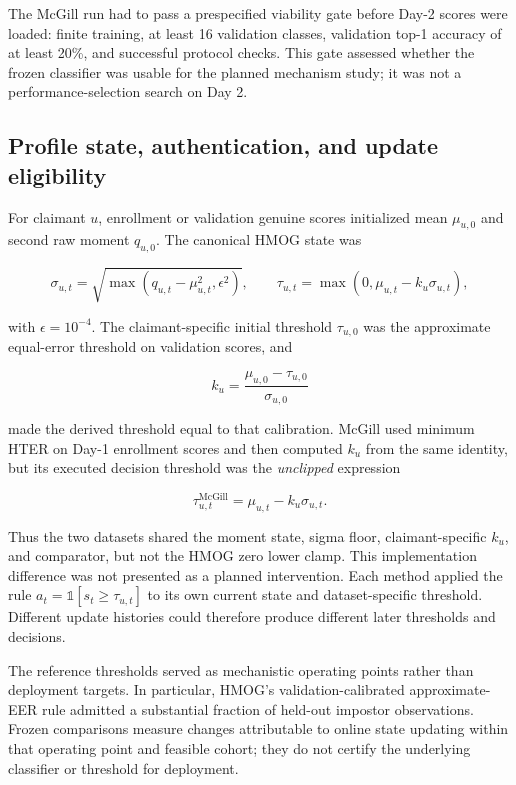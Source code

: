 \documentclass[technologies,article,submit,moreauthors]{Definitions/mdpi}
\begin{document}
The McGill run had to pass a prespecified viability gate before Day-2 scores were loaded: finite training, at least 16 validation classes, validation top-1 accuracy of at least 20\%, and successful protocol checks. This gate assessed whether the frozen classifier was usable for the planned mechanism study; it was not a performance-selection search on Day 2.

\subsection{Profile state, authentication, and update eligibility}\label{sec:profile-state-authentication-and-update-eligibility}

For claimant \(u\), enrollment or validation genuine scores initialized mean \(\mu_{u,0}\) and second raw moment \(q_{u,0}\). The canonical HMOG state was

\[
\sigma_{u,t}=\sqrt{\max(q_{u,t}-\mu_{u,t}^2,\epsilon^2)},
\qquad
\tau_{u,t}=\max(0,\mu_{u,t}-k_u\sigma_{u,t}),
\]

with \(\epsilon=10^{-4}\). The claimant-specific initial threshold \(\tau_{u,0}\) was the approximate equal-error threshold on validation scores, and

\[
k_u=\frac{\mu_{u,0}-\tau_{u,0}}{\sigma_{u,0}}
\]

made the derived threshold equal to that calibration. McGill used minimum HTER on Day-1 enrollment scores and then computed \(k_u\) from the same identity, but its executed decision threshold was the \emph{unclipped} expression

\[
\tau^{\mathrm{McGill}}_{u,t}=\mu_{u,t}-k_u\sigma_{u,t}.
\]

Thus the two datasets shared the moment state, sigma floor, claimant-specific \(k_u\), and comparator, but not the HMOG zero lower clamp. This implementation difference was not presented as a planned intervention. Each method applied the rule \(a_t=\mathbb{1}[s_t\geq\tau_{u,t}]\) to its own current state and dataset-specific threshold. Different update histories could therefore produce different later thresholds and decisions.

The reference thresholds served as mechanistic operating points rather than deployment targets. In particular, HMOG's validation-calibrated approximate-EER rule admitted a substantial fraction of held-out impostor observations. Frozen comparisons measure changes attributable to online state updating within that operating point and feasible cohort; they do not certify the underlying classifier or threshold for deployment.
\end{document}
